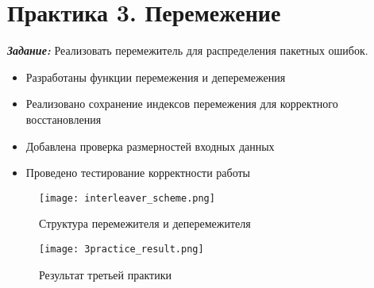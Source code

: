 \chapter*{Практика 3. Перемежение}
\label{ch:3_practice}

\textit{\textbf{Задание:}} Реализовать перемежитель для распределения пакетных ошибок.

\begin{itemize}
    \item Разработаны функции перемежения и деперемежения
    \item Реализовано сохранение индексов перемежения для корректного восстановления
    \item Добавлена проверка размерностей входных данных
    \item Проведено тестирование корректности работы
\end{itemize}

\begin{figure}[ht]
    \centering
    \texttt{[image: interleaver\_scheme.png]}
    \caption{Структура перемежителя и деперемежителя}
    \label{fig:interleaver_scheme}
\end{figure}

\begin{figure}[ht]
    \centering
    \texttt{[image: 3practice\_result.png]}
    \caption{Результат третьей практики}
    \label{fig:3practice_result}
\end{figure}